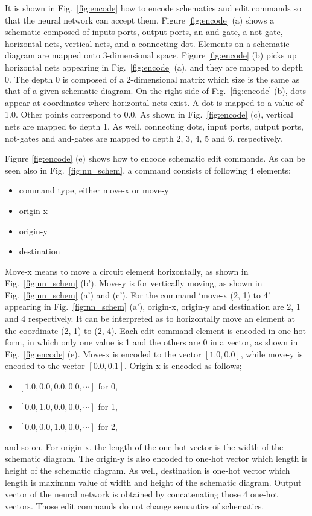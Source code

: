 \documentclass[twocolumn]{article}
\begin{document}
It is shown in Fig.\ \ref{fig:encode} how to encode
schematics and edit commands so that the neural network can accept them.
Figure \ref{fig:encode} (a) shows a schematic composed of
inputs ports, output ports, an and-gate, a not-gate,
horizontal nets, vertical nets, and a connecting dot.
Elements on a schematic diagram are
mapped onto 3-dimensional space.
Figure \ref{fig:encode} (b) picks up horizontal nets appearing
in Fig.\ \ref{fig:encode} (a), and they are mapped to depth 0.
The depth 0 is composed of a 2-dimensional matrix which size is the same
as that of a given schematic diagram.
On the right side of Fig.\ \ref{fig:encode} (b),
dots appear at coordinates where horizontal nets exist.
A dot is mapped to a value of 1.0.
Other points correspond to 0.0.
As shown in Fig.\ \ref{fig:encode} (c),
vertical nets are mapped to depth 1.
As well, connecting dots, input ports, output ports, not-gates and and-gates
are mapped to depth 2, 3, 4, 5 and 6, respectively.

Figure \ref{fig:encode} (e) shows how to encode schematic edit commands.
As can be seen also in Fig.\ \ref{fig:nn_schem},
a command consists of following 4 elements:
\begin{itemize}
\item command type, either move-x or move-y
\item origin-x
\item origin-y
\item destination
\end{itemize}
Move-x means to move a circuit element horizontally,
as shown in Fig.\ \ref{fig:nn_schem} (b').
Move-y is for vertically moving, as shown in
Fig.\ \ref{fig:nn_schem} (a') and (c').
For the command `move-x (2, 1) to 4' appearing
in Fig.\ \ref{fig:nn_schem} (a'),
origin-x, origin-y and destination are 2, 1 and 4 respectively.
It can be interpreted as to horizontally move an element
at the coordinate (2, 1) to (2, 4).
Each edit command element is encoded in one-hot form,
in which only one value is 1 and the others are 0 in a vector,
as shown in Fig.\ \ref{fig:encode} (e).
Move-x is encoded to the vector $[1.0, 0.0]$, 
while move-y is encoded to the vector $[0.0, 0.1]$. 
Origin-x is encoded as follows;
\begin{itemize}
\item $[1.0, 0.0, 0.0, 0.0, \cdots]$ for 0,
\item $[0.0, 1.0, 0.0, 0.0, \cdots]$ for 1, 
\item $[0.0, 0.0, 1.0, 0.0, \cdots]$ for 2,
\end{itemize}
and so on.
For origin-x, the length of the one-hot vector is the width of
the schematic diagram.
The origin-y is also encoded to one-hot vector which length is
height of the schematic diagram.
As well, destination is one-hot vector which length is
maximum value of width and height of the schematic diagram.
Output vector of the neural network is obtained
by concatenating those 4 one-hot vectors.
Those edit commands do not change semantics of schematics.
\end{document}
